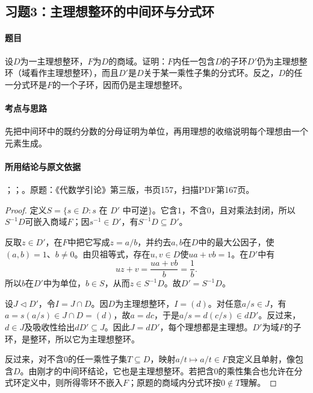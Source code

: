 \subsection{习题3：主理想整环的中间环与分式环}

\label{ex:4:3}

\paragraph{题目}

设$D$为一主理想整环，$F$为$D$的商域。证明：$F$内任一包含$D$的子环$D'$仍为主理想整环（域看作主理想整环），而且$D'$是$D$关于某一乘性子集的分式环。反之，$D$的任一分式环是$F$的一个子环，因而仍是主理想整环。

\paragraph{考点与思路}

先把中间环中的既约分数的分母证明为单位，再用理想的收缩说明每个理想由一个元素生成。

\paragraph{所用结论与原文依据}

；；。原题：《代数学引论》第三版，书页157，扫描PDF第167页。


\begin{proof}

定义$S=\{s\in D:s\text{ 在 }D'\text{ 中可逆}\}$。它含$1$，不含$0$，且对乘法封闭，所以$S^{-1}D$可嵌入商域$F$；因$s^{-1}\in D'$，有$S^{-1}D\subseteq D'$。

反取$z\in D'$，在$F$中把它写成$z=a/b$，并约去$a,b$在$D$中的最大公因子，使$(a,b)=1$、$b\ne0$。由贝祖等式，存在$u,v\in D$使$ua+vb=1$。在$D'$中有
\[
uz+v=\frac{ua+vb}{b}=\frac1b.
\]
所以$b$在$D'$中为单位，$b\in S$，从而$z\in S^{-1}D$。故$D'=S^{-1}D$。

设$J\lhd D'$，令$I=J\cap D$。因$D$为主理想整环，$I=(d)$。对任意$a/s\in J$，有$a=s(a/s)\in J\cap D=(d)$，故$a=dc$，于是$a/s=d(c/s)\in dD'$。反过来，$d\in J$及吸收性给出$dD'\subseteq J$。因此$J=dD'$，每个理想都是主理想。$D'$为域$F$的子环，是整环，所以它为主理想整环。

反过来，对不含$0$的任一乘性子集$T\subseteq D$，映射$a/t\mapsto a/t\in F$良定义且单射，像包含$D$。由刚才的中间环结论，它也是主理想整环。若把含$0$的乘性集合也允许在分式环定义中，则所得零环不嵌入$F$；原题的商域内分式环按$0\notin T$理解。

\end{proof}

